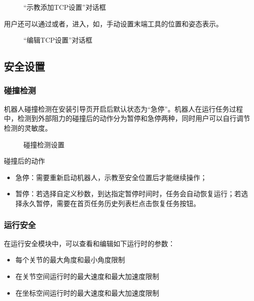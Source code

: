 \begin{figure}[ht]
	\centering
	\color{red}{缺图}
	\caption{“示教添加TCP设置”对话框}
	\label{fig:示教添加TCP设置}
\end{figure}

用户还可以通过或者，进入，如，手动设置末端工具的位置和姿态表示。

\begin{figure}[ht]
	\centering
	\color{red}{缺图}
	\caption{“编辑TCP设置”对话框}
	\label{fig:编辑TCP设置}
\end{figure}

\subsection{安全设置}
\subsubsection{碰撞检测}
机器人碰撞检测在安装引导页开启后默认状态为“急停”。机器人在运行任务过程中，检测到外部阻力的碰撞后的动作分为暂停和急停两种，同时用户可以自行调节检测的灵敏度。

\begin{figure}[ht]
	\centering
	\color{red}{缺图}
	\caption{碰撞检测设置}
	\label{fig:碰撞检测设置}
\end{figure}

碰撞后的动作
\begin{itemize}
	\item 急停：需要重新启动机器人，示教至安全位置后才能继续操作；
	\item 暂停：若选择自定义秒数，到达指定暂停时间时，任务会自动恢复运行；若选择永久暂停，需要在首页任务历史列表栏点击恢复任务按钮。
\end{itemize}

\subsubsection{运行安全}
\label{sec:运行安全}
在运行安全模块中，可以查看和编辑如下运行时的参数：
\begin{itemize}
	\item 每个关节的最大角度和最小角度限制
	\item 在关节空间运行时的最大速度和最大加速度限制
	\item 在坐标空间运行时的最大速度和最大加速度限制
\end{itemize}

